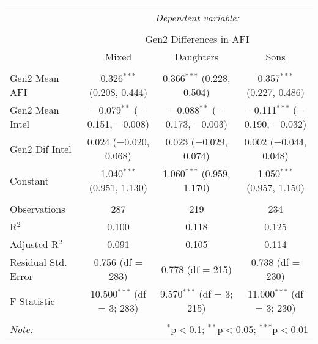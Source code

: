 
\begingroup 
\small 
\begin{tabular}{@{\extracolsep{1pt}}lccc} 
\\[-1.8ex]\hline 
\hline \\[-1.8ex] 
 & \multicolumn{3}{c}{\textit{Dependent variable:}} \\ 
\cline{2-4} 
\\[-1.8ex] & \multicolumn{3}{c}{Gen2 Differences in AFI} \\ 
 & Mixed & Daughters & Sons \\ 
\hline \\[-1.8ex] 
 Gen2 Mean AFI & 0.326$^{***}$ (0.208, 0.444) & 0.366$^{***}$ (0.228, 0.504) & 0.357$^{***}$ (0.227, 0.486) \\ 
  Gen2 Mean Intel & $-$0.079$^{**}$ ($-$0.151, $-$0.008) & $-$0.088$^{**}$ ($-$0.173, $-$0.003) & $-$0.111$^{***}$ ($-$0.190, $-$0.032) \\ 
  Gen2 Dif Intel & 0.024 ($-$0.020, 0.068) & 0.023 ($-$0.029, 0.074) & 0.002 ($-$0.044, 0.048) \\ 
  Constant & 1.040$^{***}$ (0.951, 1.130) & 1.060$^{***}$ (0.959, 1.170) & 1.050$^{***}$ (0.957, 1.150) \\ 
 \hline \\[-1.8ex] 
Observations & 287 & 219 & 234 \\ 
R$^{2}$ & 0.100 & 0.118 & 0.125 \\ 
Adjusted R$^{2}$ & 0.091 & 0.105 & 0.114 \\ 
Residual Std. Error & 0.756 (df = 283) & 0.778 (df = 215) & 0.738 (df = 230) \\ 
F Statistic & 10.500$^{***}$ (df = 3; 283) & 9.570$^{***}$ (df = 3; 215) & 11.000$^{***}$ (df = 3; 230) \\ 
\hline 
\hline \\[-1.8ex] 
\textit{Note:}  & \multicolumn{3}{r}{$^{*}$p$<$0.1; $^{**}$p$<$0.05; $^{***}$p$<$0.01} \\ 
\end{tabular} 
\endgroup 
